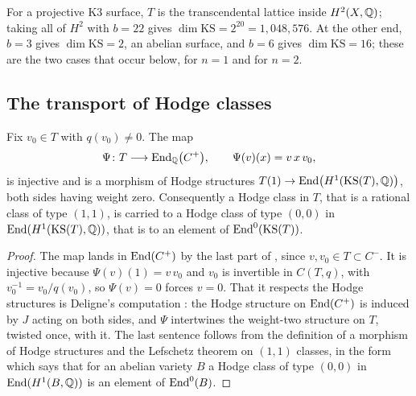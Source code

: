 \begin{example}\label{ex:ksdims}
For a projective K3 surface, $T$ is the transcendental lattice inside
$H^{2}(X,\mathbb{Q})$; taking all of $H^{2}$ with $b=22$ gives
$\dim\mathrm{KS}=2^{20}=1{,}048{,}576$. At the other end, $b=3$ gives
$\dim\mathrm{KS}=2$, an abelian surface, and $b=6$ gives
$\dim\mathrm{KS}=16$; these are the two cases that occur below, for $n=1$ and
for $n=2$.
\end{example}

\subsection{The transport of Hodge classes}

\begin{proposition}\label{prop:ksembed}
Fix $v_{0}\in T$ with $q(v_{0})\ne0$. The map
\[
  \Psi\colon T\longrightarrow\operatorname{End}_{\mathbb{Q}}\bigl(C^{+}\bigr),
  \qquad
  \Psi(v)(x)=v\,x\,v_{0},
\]
is injective and is a morphism of Hodge structures
$T(1)\to\operatorname{End}\bigl(H^{1}(\mathrm{KS}(T),\mathbb{Q})\bigr)$, both sides having weight
zero. Consequently a Hodge class in $T$, that is a rational class of type
$(1,1)$, is carried to a Hodge class of type $(0,0)$ in
$\operatorname{End}(H^{1}(\mathrm{KS}(T),\mathbb{Q}))$, that is to an element of
$\operatorname{End}^{0}(\mathrm{KS}(T))$.
\end{proposition}

\begin{proof}
The map lands in $\operatorname{End}(C^{+})$ by the last part of , since
$v,v_{0}\in T\subset C^{-}$. It is injective because $\Psi(v)(1)=v\,v_{0}$
and $v_{0}$ is invertible in $C(T,q)$, with $v_{0}^{-1}=v_{0}/q(v_{0})$, so
$\Psi(v)=0$ forces $v=0$. That it respects the Hodge structures is
Deligne's computation \cite[\S4]{Del72}: the Hodge structure on
$\operatorname{End}(C^{+})$ is induced by $J$ acting on both sides, and $\Psi$ intertwines
the weight-two structure on $T$, twisted once, with it. The last sentence
follows from the definition of a morphism of Hodge structures and the
Lefschetz theorem on $(1,1)$ classes, in the form which says that for an
abelian variety $B$ a Hodge class of type $(0,0)$ in $\operatorname{End}(H^{1}(B,\mathbb{Q}))$ is
an element of $\operatorname{End}^{0}(B)$.
\end{proof}

